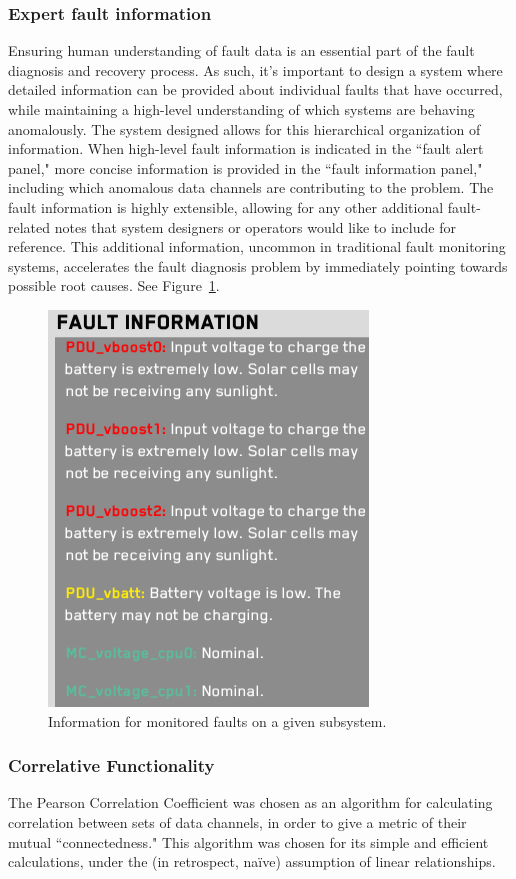 \subsubsection{Expert fault information}

Ensuring human understanding of fault data is an essential part of the fault diagnosis and recovery process. As such, it's important to design a system where detailed information can be provided about individual faults that have occurred, while maintaining a high-level understanding of which systems are behaving anomalously. The system designed allows for this hierarchical organization of information. When high-level fault information is indicated in the ``fault alert panel," more concise information is provided in the ``fault information panel," including which anomalous data channels are contributing to the problem. The fault information is highly extensible, allowing for any other additional fault-related notes that system designers or operators would like to include for reference. This additional information, uncommon in traditional fault monitoring systems, accelerates the fault diagnosis problem by immediately pointing towards possible root causes. See Figure~\ref{fig:fault_info2}.

\begin{figure}[h]
\centering
    \includegraphics[width=0.4\columnwidth]{images/fault_info2.png}
    \caption{Information for monitored faults on a given subsystem.}
    \label{fig:fault_info2}
\end{figure}

\subsubsection{Correlative Functionality}

The Pearson Correlation Coefficient was chosen as an algorithm for calculating correlation between sets of data channels, in order to give a metric of their mutual ``connectedness." This algorithm was chosen for its simple and efficient calculations, under the (in retrospect, naïve) assumption of linear relationships.

